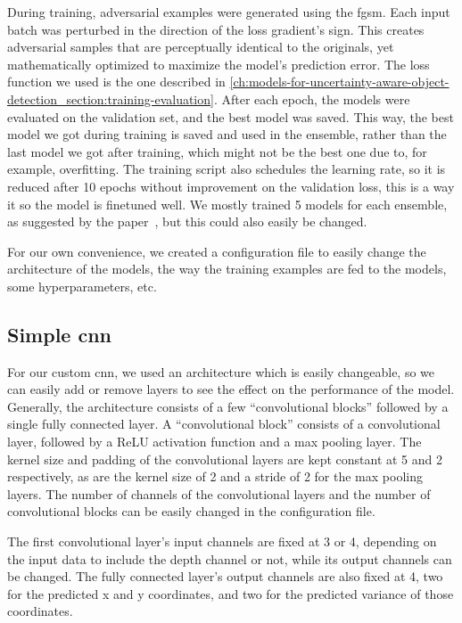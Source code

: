 During training, adversarial examples were generated using the \gls{fgsm}.
Each input batch was perturbed in the direction of the loss gradient's sign.
This creates adversarial samples that are perceptually identical to the originals, yet mathematically optimized to maximize the model's prediction error.
The loss function we used is the one described in \cref{ch:models-for-uncertainty-aware-object-detection_section:training-evaluation}.
After each epoch, the models were evaluated on the validation set, and the best model was saved.
This way, the best model we got during training is saved and used in the ensemble, rather than the last model we got after training, which might not be the best one due to, for example, overfitting.
The training script also schedules the learning rate, so it is reduced after 10 epochs without improvement on the validation loss, this is a way it so the model is finetuned well.
We mostly trained 5 models for each ensemble, as suggested by the paper~\cite{src:deep-ensemble-methods}, but this could also easily be changed.

For our own convenience, we created a configuration file to easily change the architecture of the models, the way the training examples are fed to the models, some hyperparameters, etc.

\subsection{Simple \gls{cnn}}\label{ch:models-for-uncertainty-aware-object-detection_section:deep-ensembles_subsection:simple-cnn}
For our custom \gls{cnn}, we used an architecture which is easily changeable, so we can easily add or remove layers to see the effect on the performance of the model.
Generally, the architecture consists of a few ``convolutional blocks'' followed by a single fully connected layer.
A ``convolutional block'' consists of a convolutional layer, followed by a ReLU activation function and a max pooling layer.
The kernel size and padding of the convolutional layers are kept constant at 5 and 2 respectively, as are the kernel size of 2 and a stride of 2 for the max pooling layers.
The number of channels of the convolutional layers and the number of convolutional blocks can be easily changed in the configuration file.

The first convolutional layer's input channels are fixed at 3 or 4, depending on the input data to include the depth channel or not, while its output channels can be changed.
The fully connected layer's output channels are also fixed at 4, two for the predicted x and y coordinates, and two for the predicted variance of those coordinates.

